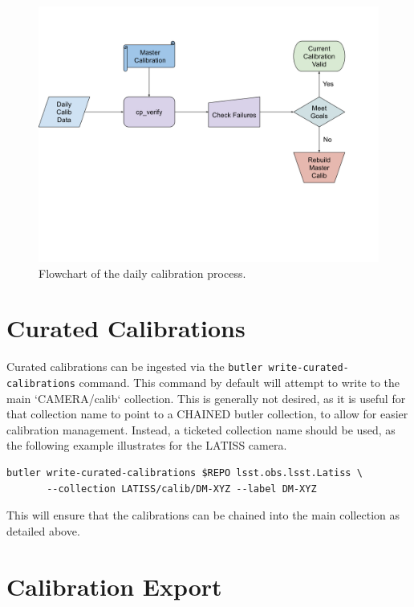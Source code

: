 \documentclass[DM,authoryear,toc]{lsstdoc}
\begin{document}
\begin{figure}
  \includegraphics[width=\linewidth]{figures/daily_processing.png}
  \caption{Flowchart of the daily calibration process.}
  \label{fig:daily}
\end{figure}

\section{Curated Calibrations}

Curated calibrations can be ingested via the \verb|butler write-curated-calibrations| command.  This command by default will attempt to write to the main `CAMERA/calib` collection.  This is generally not desired, as it is useful for that collection name to point to a CHAINED butler collection, to allow for easier calibration management.  Instead, a ticketed collection name should be used, as the following example illustrates for the LATISS camera.

\begin{verbatim}
butler write-curated-calibrations $REPO lsst.obs.lsst.Latiss \
       --collection LATISS/calib/DM-XYZ --label DM-XYZ
\end{verbatim}

This will ensure that the calibrations can be chained into the main collection as detailed above.

\section{Calibration Export}
\label{sec:calib_export}
\end{document}
